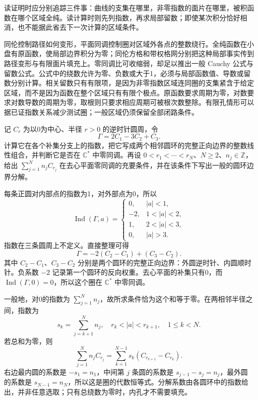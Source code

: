 \ProseParagraphBreak
读证明时应分别追踪三件事：曲线的支集在哪里，非零指数的面片在哪里，被积函数在哪个区域全纯。读计算时则先列指数，再求局部留数；即使某次积分恰好相消，也不能据此省去下一次计算的区域条件。





\begin{chaptersummary}
同伦控制路径如何变形，平面同调控制圈对区域外各点的整数绕行。全纯函数在小盘有原函数，使局部边界积分为零；同伦方格和带权格网分别把这种局部事实传到路径变形与有限面片填充上。零同调比可收缩弱，却足以推出一般 Cauchy 公式与留数公式。公式中的绕数允许为零、负数或大于1，必须与局部函数值、导数或留数分别计算。相关留数只有有限项，是因为非零指数区域连同圈的支集紧含于给定区域，而不是因为函数在整个区域只有有限个极点。原函数要求周期为零，对数要求对数导数的周期为零，取根则只要求相应周期可被根次数整除。有限孔情形可以据已证指数关系减少测试圈；一般区域仍须保留全部闭路条件。
\end{chaptersummary}

\BookExercises

\begin{exercise}\label{b3:ex:10-1}
记 \(C_r\) 为以0为中心、半径 \(r>0\) 的逆时针圆周，令
\[
 \Gamma=2C_1-3C_2+C_3.
\]
计算它在各个补集分支上的指数，把它写成两个相邻圆环的完整正向边界的整数线性组合，并判断它是否在 \(\mathbb C^*\) 中零同调。再设 \(0<r_1<\cdots<r_N\)、\(N\ge2\)、\(n_j\in\mathbb Z\)，给出 \(\sum_{j=1}^N n_jC_{r_j}\) 在去心平面零同调的充要条件，并在该条件下写出一般的圆环边界分解。
\end{exercise}
\begin{solution}
每条正圆对内部点的指数为1，对外部点为0，所以
\[
 \operatorname{Ind}(\Gamma,a)=
 \begin{cases}
 0,&|a|<1,\\
 -2,&1<|a|<2,\\
 1,&2<|a|<3,\\
 0,&|a|>3.
 \end{cases}
\]
指数在三条圆周上不定义。直接整理可得
\[
 \Gamma=-2(C_2-C_1)+(C_3-C_2).
\]
其中 \(C_2-C_1\)、\(C_3-C_2\) 分别是两个圆环的完整正向边界：外圆逆时针、内圆顺时针。负系数 \(-2\) 记录第一个圆环的反向权重。去心平面的补集只有0，而 \(\operatorname{Ind}(\Gamma,0)=0\)，所以这个圈在 \(\mathbb C^*\) 中零同调。

一般地，对0的指数为 \(\sum_{j=1}^N n_j\)，故所求条件恰为这个和等于零。在两相邻半径之间，指数为
\[
 s_k=\sum_{j=k+1}^N n_j,\quad r_k<|a|<r_{k+1},\quad 1\le k<N.
\]
若总和为零，则
\[
 \sum_{j=1}^N n_jC_{r_j}
 =\sum_{k=1}^{N-1}s_k(C_{r_{k+1}}-C_{r_k}).
\]
右边最内圆的系数是 \(-s_1=n_1\)，中间第 \(j\) 条圆的系数是 \(s_{j-1}-s_j=n_j\)，最外圆的系数是 \(s_{N-1}=n_N\)，所以这是圈的代数恒等式。分解系数由各圆环中的指数给出，并非任意选取；只有总绕数为零时，内孔才不需要填充。
\end{solution}


